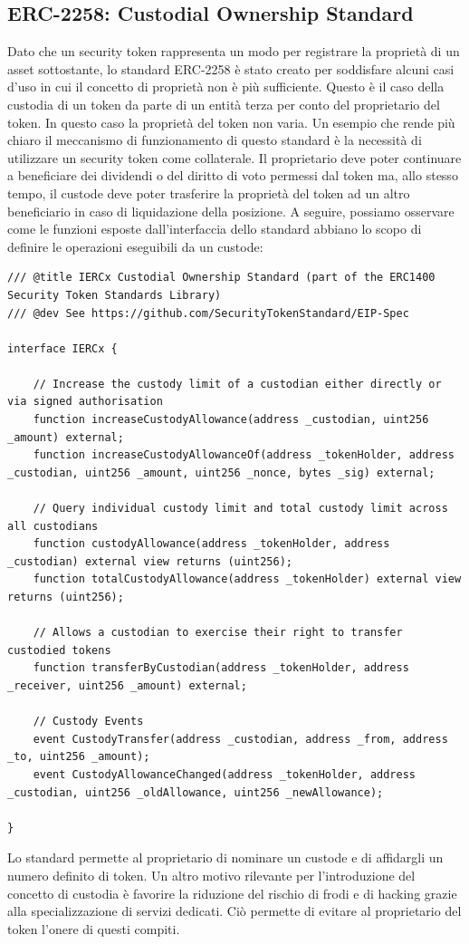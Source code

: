 \subsection{ERC-2258: Custodial Ownership Standard}
Dato che un security token rappresenta un modo per registrare la proprietà di un asset sottostante, lo standard ERC-2258 è stato creato per soddisfare alcuni casi d'uso in cui il concetto di proprietà non è più sufficiente. Questo è il caso della custodia di un token da parte di un entità terza per conto del proprietario del token. In questo caso la proprietà del token non varia. Un esempio che rende più chiaro il meccanismo di funzionamento di questo standard è la necessità di utilizzare un security token come collaterale. Il proprietario deve poter continuare a beneficiare dei dividendi o del diritto di voto permessi dal token ma, allo stesso tempo, il custode deve poter trasferire la proprietà del token ad un altro beneficiario in caso di liquidazione della posizione.   
A seguire, possiamo osservare come le funzioni esposte dall'interfaccia dello standard abbiano lo scopo di definire le operazioni eseguibili da un custode: 
\begin{lstlisting}[language=Solidity,numbers=none]
/// @title IERCx Custodial Ownership Standard (part of the ERC1400 Security Token Standards Library)
/// @dev See https://github.com/SecurityTokenStandard/EIP-Spec

interface IERCx {

    // Increase the custody limit of a custodian either directly or via signed authorisation
    function increaseCustodyAllowance(address _custodian, uint256 _amount) external;
    function increaseCustodyAllowanceOf(address _tokenHolder, address _custodian, uint256 _amount, uint256 _nonce, bytes _sig) external;

    // Query individual custody limit and total custody limit across all custodians
    function custodyAllowance(address _tokenHolder, address _custodian) external view returns (uint256);
    function totalCustodyAllowance(address _tokenHolder) external view returns (uint256);

    // Allows a custodian to exercise their right to transfer custodied tokens
    function transferByCustodian(address _tokenHolder, address _receiver, uint256 _amount) external;

    // Custody Events
    event CustodyTransfer(address _custodian, address _from, address _to, uint256 _amount);
    event CustodyAllowanceChanged(address _tokenHolder, address _custodian, uint256 _oldAllowance, uint256 _newAllowance);

}
\end{lstlisting}

Lo standard permette al proprietario di nominare un custode e di affidargli un numero definito di token. 
Un altro motivo rilevante per l'introduzione del concetto di custodia è favorire la riduzione del rischio di frodi e di hacking grazie alla specializzazione di servizi dedicati. Ciò permette di evitare al proprietario del token l'onere di questi compiti.
